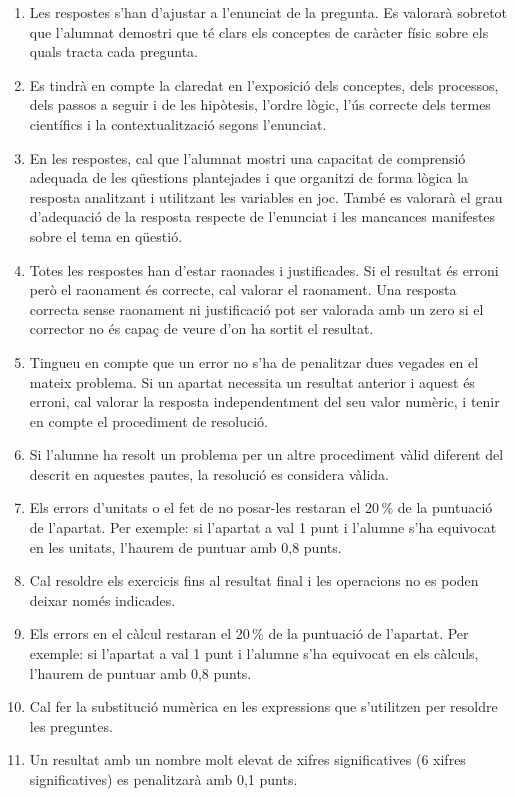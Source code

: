 \begin{enumerate}
  \item Les respostes s'han d'ajustar a l'enunciat de la pregunta. Es valorarà sobretot que l'alumnat demostri que té clars els conceptes de caràcter físic sobre els quals tracta cada pregunta.
  \item Es tindrà en compte la claredat en l'exposició dels conceptes, dels processos, dels passos a seguir i de les hipòtesis, l'ordre lògic, l'ús correcte dels termes científics i la contextualització segons l'enunciat.
  \item En les respostes, cal que l'alumnat mostri una capacitat de comprensió adequada de les qüestions plantejades i que organitzi de forma lògica la resposta analitzant i utilitzant les variables en joc. També es valorarà el grau d'adequació de la resposta respecte de l'enunciat i les mancances manifestes sobre el tema en qüestió.
  \item Totes les respostes han d'estar raonades i justificades. Si el resultat és erroni però el raonament és correcte, cal valorar el raonament. Una resposta correcta sense raonament ni justificació pot ser valorada amb un zero si el corrector no és capaç de veure d'on ha sortit el resultat.
  \item Tingueu en compte que un error no s'ha de penalitzar dues vegades en el mateix problema. Si un apartat necessita un resultat anterior i aquest és erroni, cal valorar la resposta independentment del seu valor numèric, i tenir en compte el procediment de resolució.
  \item Si l'alumne ha resolt un problema per un altre procediment vàlid diferent del descrit en aquestes pautes, la resolució es considera vàlida.
  \item Els errors d'unitats o el fet de no posar-les restaran el 20\,\% de la puntuació de l'apartat. Per exemple: si l'apartat a val 1 punt i l'alumne s'ha equivocat en les unitats, l'haurem de puntuar amb 0,8 punts.
  \item Cal resoldre els exercicis fins al resultat final i les operacions no es poden deixar només indicades.
  \item Els errors en el càlcul restaran el 20\,\% de la puntuació de l'apartat. Per exemple: si l'apartat a val 1 punt i l'alumne s'ha equivocat en els càlculs, l'haurem de puntuar amb 0,8 punts.
  \item Cal fer la substitució numèrica en les expressions que s'utilitzen per resoldre les preguntes.
  \item Un resultat amb un nombre molt elevat de xifres significatives (6 xifres significatives) es penalitzarà amb 0,1 punts.
\end{enumerate}
